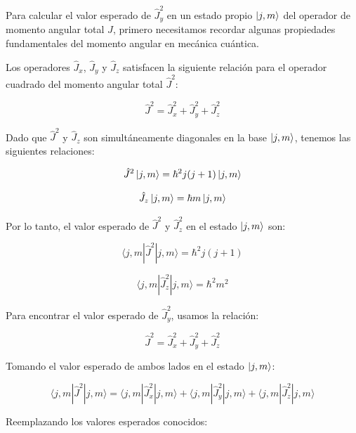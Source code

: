 Para calcular el valor esperado de $\hat{J}_y^2$ en un estado propio $\ket{j, m}$ del operador de momento angular total $\hat{J}$, primero necesitamos recordar algunas propiedades fundamentales del momento angular en mecánica cuántica.

Los operadores $\hat{J}_x$, $\hat{J}_y$ y $\hat{J}_z$ satisfacen la siguiente relación para el operador cuadrado del momento angular total $\hat{J}^2$:

\begin{equation}
\hat{J}^2 = \hat{J}_x^2 + \hat{J}_y^2 + \hat{J}_z^2
\end{equation}

Dado que $\hat{J}^2$ y $\hat{J}_z$ son simultáneamente diagonales en la base $\ket{j, m}$, tenemos las siguientes relaciones:

\begin{equation}
\hat{J}^2 \ket{j, m} = \hbar^2 j(j+1) \ket{j, m}
\end{equation}

\begin{equation}
\hat{J}_z \ket{j, m} = \hbar m \ket{j, m}
\end{equation}

Por lo tanto, el valor esperado de $\hat{J}^2$ y $\hat{J}_z^2$ en el estado $\ket{j, m}$ son:

\begin{equation}
\langle j, m | \hat{J}^2 | j, m \rangle = \hbar^2 j(j+1)
\end{equation}

\begin{equation}
\langle j, m | \hat{J}_z^2 | j, m \rangle = \hbar^2 m^2
\end{equation}

Para encontrar el valor esperado de $\hat{J}_y^2$, usamos la relación:

\begin{equation}
\hat{J}^2 = \hat{J}_x^2 + \hat{J}_y^2 + \hat{J}_z^2
\end{equation}

Tomando el valor esperado de ambos lados en el estado $\ket{j, m}$:

\begin{equation}
\langle j, m | \hat{J}^2 | j, m \rangle = \langle j, m | \hat{J}_x^2 | j, m \rangle + \langle j, m | \hat{J}_y^2 | j, m \rangle + \langle j, m | \hat{J}_z^2 | j, m \rangle
\end{equation}

Reemplazando los valores esperados conocidos:

